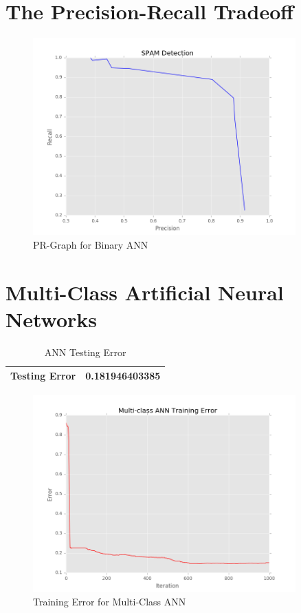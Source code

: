 \documentclass[12pt]{article}
\begin{document}
\section{The Precision-Recall Tradeoff}\label{Precision-Recall}
\begin{figure}[H]
\begin{center}
\includegraphics[width=0.9\textwidth]{precision_recall.png}
\caption{PR-Graph for Binary ANN}
\end{center}
\end{figure}

\newpage

\section{Multi-Class Artificial Neural Networks}\label{Multi-Class ANN}
\begin{table}[h]
\begin{center}
\begin{tabular}{|l|l|}
\hline
Testing Error & 0.181946403385\\
\hline
\end{tabular}
\caption{ANN Testing Error}
\end{center}
\end{table}

\begin{figure}[H]
\begin{center}
\includegraphics[width=0.9\textwidth]{multiclass_ann_training_errors.png}
\caption{Training Error for Multi-Class ANN}
\end{center}
\end{figure}
\end{document}
